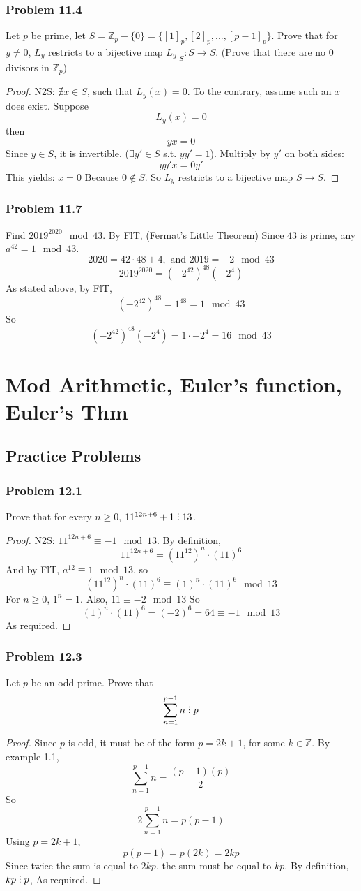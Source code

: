 \documentclass[hidelinks,12pt]{article}
\newcommand{\Z}{\mathbb{Z}}
\newcommand{\divby}{%
  \mathrel{\text{\vbox{\baselineskip.65ex\lineskiplimit0pt\hbox{.}\hbox{.}\hbox{.}}}}%
  }
\begin{document}
\subsubsection{Problem 11.4}
Let $p$ be prime, let $S=\Z_p-\{0\}=\{[1]_p,[2]_p,...,[p-1]_p\}$. Prove that for $y\neq0$, $L_y$ restricts to a bijective map $L_y|_S:S\to S$. (Prove that there are no 0 divisors in $\Z_p$)
\begin{proof}
N2S: $\nexists x\in S$, such that $L_y(x)=0$. To the contrary, assume such an $x$ does exist. \newline Suppose $$L_y(x)=0$$ then $$yx=0$$ Since $y\in S$, it is invertible, ($\exists y'\in S$ s.t. $yy'=1$). Multiply by $y'$ on both sides: $$yy'x=0y'$$ This yields: $x=0$ \scalebox{1.5}{\Lightning} Because $0\notin S$. So $L_y$ restricts to a bijective map $S\to S$.
\end{proof}
\subsubsection{Problem 11.7}
Find $2019^{2020}\mod{43}$.
\newline By FlT, (Fermat's Little Theorem) Since $43$ is prime, any $a^{42}=1\mod{43}$. $$2020=42\cdot48+4,\text{ and }2019=-2\mod{43}$$ $$2019^{2020}=(-2^{42})^{48}(-2^4)$$ As stated above, by FlT, $$(-2^{42})^{48}=1^{48}=1\mod{43}$$ So $$(-2^{42})^{48}(-2^4)=1\cdot-2^4=16\mod{43}$$
\newpage
\section{Mod Arithmetic, Euler’s function, Euler’s Thm}
\subsection{Practice Problems}
\subsubsection{Problem 12.1}
Prove that for every $n\geq0$, $11^{12n+6}+1\divby13$.
\begin{proof}
N2S: $11^{12n+6}\equiv-1\mod{13}$. By definition, $$11^{12n+6}=(11^{12})^n\cdot(11)^6$$ And by FlT, $a^{12}\equiv1\mod{13}$, so $$(11^{12})^n\cdot(11)^6\equiv(1)^n\cdot(11)^6\mod{13}$$ For $n\geq0$, $1^n=1$. Also, $11\equiv-2\mod{13}$ So $$(1)^n\cdot(11)^6=(-2)^6=64\equiv-1\mod{13}$$ As required.
\end{proof}
\subsubsection{Problem 12.3}
Let $p$ be an odd prime. Prove that $$\sum_{n=1}^{p-1}n\divby p$$
\begin{proof}
Since $p$ is odd, it must be of the form $p=2k+1$, for some $k\in\Z$. By example 1.1, $$\sum_{n=1}^{p-1}n=\frac{(p-1)(p)}{2}$$ So $$2\sum_{n=1}^{p-1}n=p(p-1)$$ Using $p=2k+1$, $$p(p-1)=p(2k)=2kp$$ Since twice the sum is equal to $2kp$, the sum must be equal to $kp$. By definition, $kp\divby p$, As required.
\end{proof}
\end{document}
